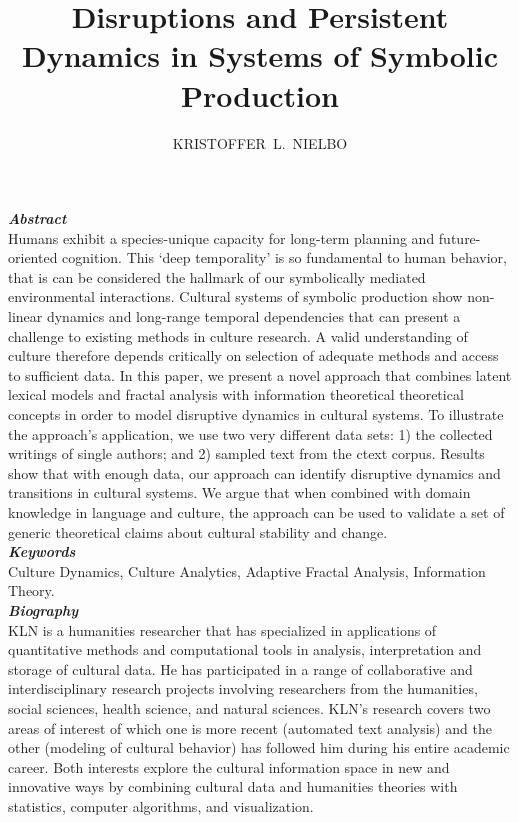 \documentclass{article}
\title{Disruptions and Persistent Dynamics in Systems of Symbolic Production}
\author{{KRISTOFFER~L.~NIELBO}}
\begin{document}
\maketitle

\textbf{\textit{Abstract}}\\
Humans exhibit a species-unique capacity for long-term planning and future-oriented cognition. This `deep temporality' is so fundamental to human behavior, that is can be considered the hallmark of our symbolically mediated environmental interactions. Cultural systems of symbolic production show non-linear dynamics and long-range temporal dependencies that can present a challenge to existing methods in culture research. A valid understanding of culture therefore depends critically on selection of adequate methods and access to sufficient data. In this paper, we present a novel approach that combines latent lexical models and fractal analysis with information theoretical theoretical concepts in order to model disruptive dynamics in cultural systems. To illustrate the approach's application, we use two very different data sets: 1) the collected writings of single authors; and  2) sampled text from the ctext corpus. Results show that with enough data, our approach can identify disruptive dynamics and transitions in cultural systems. We argue that when combined with domain knowledge in language and culture, the approach can be used to validate a set of generic theoretical claims about cultural stability and change.\\

\medskip
\textbf{\textit{Keywords}}\\
Culture Dynamics, Culture Analytics, Adaptive Fractal Analysis, Information Theory.\\ 

\medskip
\textbf{\textit{Biography}}\\
KLN is a humanities researcher that has specialized in applications of quantitative methods and computational tools in analysis, interpretation and storage of cultural data. He has participated in a range of collaborative and interdisciplinary research projects involving researchers from the humanities, social sciences, health science, and natural sciences. KLN's research covers two areas of interest of which one is more recent (automated text analysis) and the other (modeling of cultural behavior) has followed him during his entire academic career. Both interests explore the cultural information space in new and innovative ways by combining cultural data and humanities theories with statistics, computer algorithms, and visualization.
\end{document}
